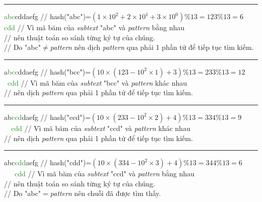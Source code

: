 \documentclass[a4paper,11pt]{article}
\begin{document}
\begin{enumerate}
			\vspace*{4mm}
			\hrule
			\textcolor{ForestGreen}{abc}cddaefg \hspace*{0.6cm} // hash("abc")=$(1\times10^2+2\times10^1+3\times10^0) \% 13=123 \% 13=6$\\
			\textcolor{ForestGreen}{cdd} \hspace*{1.8cm} // Vì mã băm của \textit{subtext} "abc" và \textit{pattern} bằng nhau \\
		\hspace*{2.5cm} // nên thuật toán so sánh từng ký tự của chúng.\\
		\hspace*{2.5cm} // Do "abc"$\neq$\textit{pattern} nên dịch \textit{pattern} qua phải 1 phần tử để tiếp tục tìm kiếm.

			\vspace*{2mm}
			\hrule
			a\textcolor{ForestGreen}{bcc}ddaefg \hspace*{0.6cm} // hash("bcc")=$(10\times(123-10^2\times1)+3)\%13=233\%13=12$\\
			\textcolor{white}{a}\textcolor{ForestGreen}{cdd} \hspace*{1.6cm} // Vì mã băm của \textit{subtext} "bcc" và \textit{pattern} khác nhau \\
		\hspace*{2.5cm} // nên dịch \textit{pattern} qua phải 1 phần tử để tiếp tục tìm kiếm.

			\vspace*{2mm}
			\hrule
			ab\textcolor{ForestGreen}{ccd}daefg \hspace*{0.6cm} // hash("ccd")=$(10\times(233-10^2\times2)+4)\%13=334\%13=9$\\
			\textcolor{white}{aa}\textcolor{ForestGreen}{cdd} \hspace*{1.4cm} // Vì mã băm của \textit{subtext} "ccd" và \textit{pattern} khác nhau \\
		\hspace*{2.5cm} // nên dịch \textit{pattern} qua phải 1 phần tử để tiếp tục tìm kiếm.

			\vspace*{2mm}
			\hrule
			abc\textcolor{ForestGreen}{cdd}aefg \hspace*{0.6cm} // hash("cdd")=$(10\times(334-10^2\times3)+4)\%13=344\%13=6$\\
			\textcolor{white}{aaa}\textcolor{ForestGreen}{cdd} \hspace*{1.2cm} // Vì mã băm của \textit{subtext} "ccd" và \textit{pattern} bằng nhau \\
		\hspace*{2.5cm} // nên thuật toán so sánh từng ký tự của chúng.\\
		\hspace*{2.5cm} // Do "abc"$=$\textit{pattern} nên chuỗi đã được tìm thấy.


\end{enumerate}
\end{document}
